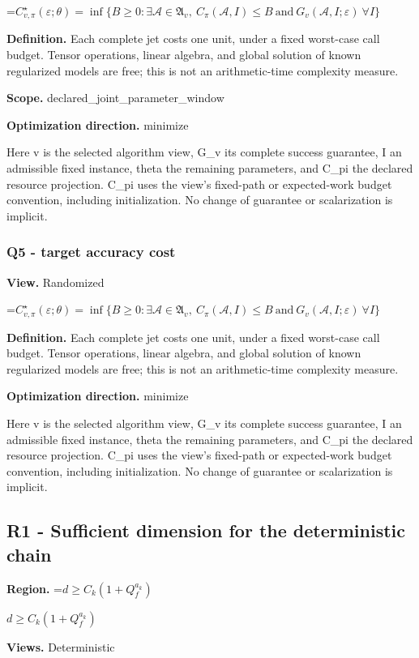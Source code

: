 \documentclass[10pt,a4paper]{article}
\newcommand{\AtlasMath}[1]{\par\begingroup\centering\setbox0=\hbox{$\displaystyle #1$}\ifdim\wd0>1.4\linewidth\typeout{ATLAS WIDE FORMULA: \the\wd0}\fi\ifdim\wd0>\linewidth\resizebox{\linewidth}{!}{\box0}\else\box0\fi\par\endgroup}
\newcommand{\AtlasInlineMath}[1]{\begingroup\setbox0=\hbox{$#1$}\ifdim\wd0>.4\linewidth\endgroup\AtlasMath{#1}\else\endgroup$#1$\fi}
\begin{document}
\AtlasMath{C^\star_{v,\pi}(\varepsilon;\theta)=\inf\{B\ge0:\exists\mathcal A\in\mathfrak A_v,\ C_\pi(\mathcal A,I)\le B\ \text{and}\ G_v(\mathcal A,I;\varepsilon)\ \forall I\}}
\textbf{Definition.} Each complete jet costs one unit, under a fixed worst-case call budget. Tensor operations, linear algebra, and global solution of known regularized models are free; this is not an arithmetic-time complexity measure.

\textbf{Scope.} declared\_joint\_parameter\_window

\textbf{Optimization direction.} minimize

Here v is the selected algorithm view, G\_v its complete success guarantee, I an admissible fixed instance, theta the remaining parameters, and C\_pi the declared resource projection. C\_pi uses the view's fixed-path or expected-work budget convention, including initialization. No change of guarantee or scalarization is implicit.

\subsubsection{Q5 - target accuracy cost}
\textbf{View.} Randomized

\AtlasMath{C^\star_{v,\pi}(\varepsilon;\theta)=\inf\{B\ge0:\exists\mathcal A\in\mathfrak A_v,\ C_\pi(\mathcal A,I)\le B\ \text{and}\ G_v(\mathcal A,I;\varepsilon)\ \forall I\}}
\textbf{Definition.} Each complete jet costs one unit, under a fixed worst-case call budget. Tensor operations, linear algebra, and global solution of known regularized models are free; this is not an arithmetic-time complexity measure.

\textbf{Optimization direction.} minimize

Here v is the selected algorithm view, G\_v its complete success guarantee, I an admissible fixed instance, theta the remaining parameters, and C\_pi the declared resource projection. C\_pi uses the view's fixed-path or expected-work budget convention, including initialization. No change of guarantee or scalarization is implicit.

\subsection{R1 - Sufficient dimension for the deterministic chain}
\textbf{Region.} \AtlasInlineMath{d\ge C_k(1+Q_f^{a_k})}

\textbf{Views.} Deterministic
\end{document}
